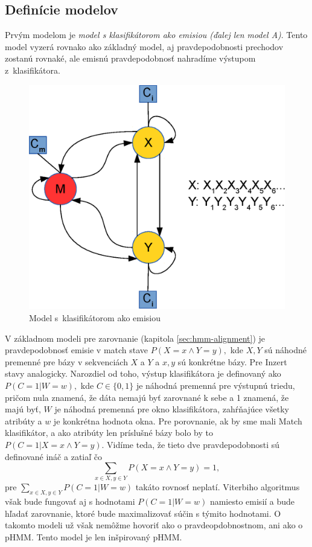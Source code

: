 \subsection{Definície modelov}


Prvým modelom je \textit{model s klasifikátorom ako emisiou (ďalej len model A)}. Tento model vyzerá rovnako ako základný model, aj pravdepodobnosti prechodov zostanú rovnaké, ale emisnú pravdepodobnosť nahradíme výstupom z~klasifikátora.
\begin{figure}[htp]
    \centering
    \includegraphics[width=.5\textwidth]{images/model_clf}
    \caption{Model s~klasifikátorom ako emisiou}
\end{figure}

V základnom modeli pre zarovnanie (kapitola \ref{sec:hmm-alignment}) je pravdepodobnosť emisie v match stave $P(X=x \wedge Y=y),$ kde $X, Y$ sú náhodné premenné pre bázy v sekvenciách $X$ a $Y$ a $x, y$ sú konkrétne bázy. Pre Inzert stavy analogicky.
Narozdiel od toho, výstup klasifikátora je definovaný ako $P(C=1 | W=w),$ kde $C \in \{0,1\}$ je náhodná premenná pre výstupnú triedu, pričom nula znamená, že dáta nemajú byť zarovnané k sebe a 1 znamená, že majú byť, $W$ je náhodná premenná pre okno klasifikátora, zahŕňajúce všetky atribúty a $w$ je konkrétna hodnota okna.
Pre porovnanie, ak by sme mali Match klasifikátor, a ako atribúty len príslušné bázy bolo by to $P(C=1 | X=x \wedge Y=y)$. Vidíme teda, že tieto dve pravdepodobnosti sú definované ináč a zatiaľ čo
$$\sum_{x \in X, y \in Y} P(X=x \wedge Y=y) = 1,$$
pre $\sum_{x \in X, y \in Y} P(C=1| W=w)$ takáto rovnosť neplatí.
Viterbiho algoritmus však bude fungovať aj s hodnotami $P(C=1| W=w)$ namiesto emisií a bude hľadať zarovnanie, ktoré bude maximalizovať súčin s týmito hodnotami.
O takomto modeli už však nemôžme hovoriť ako o pravdeopdobnostnom, ani ako o pHMM. Tento model je len inšpirovaný pHMM.


